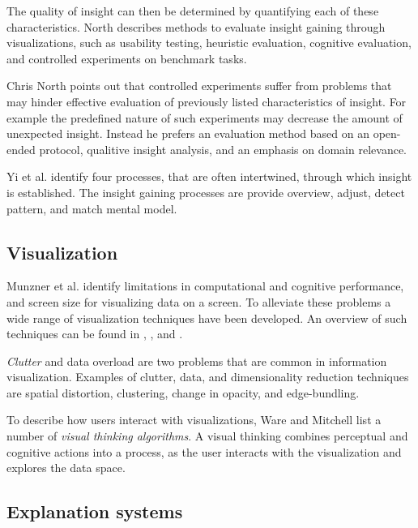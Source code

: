 \documentclass[a4paper,10pt,twocolumn]{article}
\begin{document}
The quality of insight can then be determined by quantifying each of these characteristics\cite{north:2006}. North describes methods to evaluate insight gaining through visualizations, such as usability testing, heuristic evaluation, cognitive evaluation, and controlled experiments on benchmark tasks\cite{north:2006}.

Chris North points out that controlled experiments suffer from problems that may hinder effective evaluation of previously listed characteristics of insight. For example the predefined nature of such experiments may decrease the amount of unexpected insight. Instead he prefers an evaluation method based on an open-ended protocol, qualitive insight analysis, and an emphasis on domain relevance\cite{north:2006}.

Yi et al. \cite{yi:2008} identify four processes, that are often intertwined, through which insight is established. The insight gaining processes are provide overview, adjust, detect pattern, and match mental model.


\subsection{Visualization}

Munzner et al. \cite{shirley:2009} identify limitations in computational and cognitive performance, and screen size for visualizing data on a screen. To alleviate these problems a wide range of visualization techniques have been developed. An overview of such techniques can be found in \cite{keim:2002}, \cite{ware:2004}, and \cite{herman:2000}.

\emph{Clutter} and data overload are two problems that are common in information visualization\cite{shirley:2009}. Examples of clutter, data, and dimensionality reduction techniques are spatial distortion, clustering, change in opacity, and edge-bundling\cite{ellis:2007, herman:2000, Holten:2006:HEB:1187627.1187772}.

To describe how users interact with visualizations, Ware and Mitchell \cite{ware:2004} list a number of \emph{visual thinking algorithms}. A visual thinking combines perceptual and cognitive actions into a process, as the user interacts with the visualization and explores the data space\cite{ware:2004}.


\subsection{Explanation systems}
\end{document}
